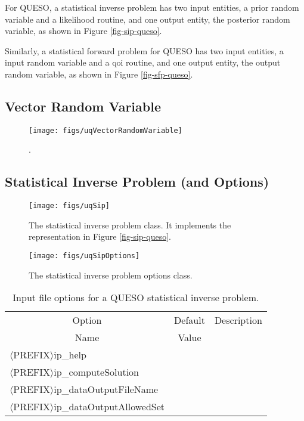 For QUESO, a statistical inverse problem has two input entities, a prior random variable and
a likelihood routine, and one output entity, the posterior random variable, as shown in Figure \ref{fig-sip-queso}.

Similarly, a statistical forward problem for QUESO has two input entities, a input random variable and
a qoi routine, and one output entity, the output random variable, as shown in Figure \ref{fig-sfp-queso}.

\clearpage
\subsection{Vector Random Variable}

\begin{figure}[h!]
\centerline{
\texttt{[image: figs/uqVectorRandomVariable]}
}
\caption{
{\color{red}{The class diagram for the vector random variable class}}.
}
\label{fig-vector-rv-class}
\end{figure}

\clearpage
\subsection{Statistical Inverse Problem (and Options)}

\begin{figure}[h!]
\centerline{
\texttt{[image: figs/uqSip]}
}
\caption{
The statistical inverse problem class. It implements the representation in Figure \ref{fig-sip-queso}.
}
\label{fig-sip-class}
\end{figure}

\begin{figure}[h!]
\begin{center}
\texttt{[image: figs/uqSipOptions]}
\end{center}
\caption{
The statistical inverse problem options class.
}
\label{fig-sip-options-class}
\end{figure}

\begin{table}[!h]
\begin{center}
\begin{tabular}{|l|c|c|}
\hline
\multicolumn{1}{|c|}{Option}                     & Default & Description \\
\multicolumn{1}{|c|}{Name}                       & Value   &             \\
\hline
\hline
$\langle$PREFIX$\rangle$ip\_help                 &         &             \\
\hline
$\langle$PREFIX$\rangle$ip\_computeSolution      &         &             \\
\hline
$\langle$PREFIX$\rangle$ip\_dataOutputFileName   &         &             \\
\hline
$\langle$PREFIX$\rangle$ip\_dataOutputAllowedSet &         &             \\
\hline
\end{tabular}
\end{center}
\caption{
Input file options for a QUESO statistical inverse problem.
}
\label{tab-sip-options}
\end{table}

